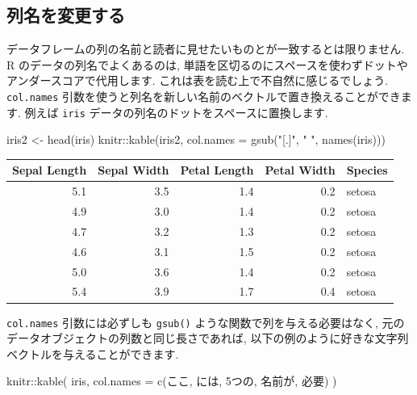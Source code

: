 \documentclass[
  11pt,
  lualatex,ja=standard,jafont=noto]{bxjsreport}
\newenvironment{Shaded}{\begin{snugshade}}{\end{snugshade}}
\newcommand{\AttributeTok}[1]{\textcolor[rgb]{0.77,0.63,0.00}{#1}}
\newcommand{\FunctionTok}[1]{\textcolor[rgb]{0.00,0.00,0.00}{#1}}
\newcommand{\NormalTok}[1]{#1}
\newcommand{\OtherTok}[1]{\textcolor[rgb]{0.56,0.35,0.01}{#1}}
\newcommand{\SpecialCharTok}[1]{\textcolor[rgb]{0.00,0.00,0.00}{#1}}
\newcommand{\StringTok}[1]{\textcolor[rgb]{0.31,0.60,0.02}{#1}}
\begin{document}
\hypertarget{change-column-names}{%
\subsection{列名を変更する}\label{change-column-names}}

データフレームの列の名前と読者に見せたいものとが一致するとは限りません. R のデータの列名でよくあるのは, 単語を区切るのにスペースを使わずドットやアンダースコアで代用します. これは表を読む上で不自然に感じるでしょう. \texttt{col.names} 引数を使うと列名を新しい名前のベクトルで置き換えることができます. 例えば \texttt{iris} データの列名のドットをスペースに置換します.

\begin{Shaded}
\begin{Highlighting}[numbers=left,,]
\NormalTok{iris2 }\OtherTok{\textless{}{-}} \FunctionTok{head}\NormalTok{(iris)}
\NormalTok{knitr}\SpecialCharTok{::}\FunctionTok{kable}\NormalTok{(iris2, }\AttributeTok{col.names =} \FunctionTok{gsub}\NormalTok{(}\StringTok{"[.]"}\NormalTok{, }\StringTok{" "}\NormalTok{, }\FunctionTok{names}\NormalTok{(iris)))}
\end{Highlighting}
\end{Shaded}

\begin{tabular}{r|r|r|r|l}
\hline
Sepal Length & Sepal Width & Petal Length & Petal Width & Species\\
\hline
5.1 & 3.5 & 1.4 & 0.2 & setosa\\
\hline
4.9 & 3.0 & 1.4 & 0.2 & setosa\\
\hline
4.7 & 3.2 & 1.3 & 0.2 & setosa\\
\hline
4.6 & 3.1 & 1.5 & 0.2 & setosa\\
\hline
5.0 & 3.6 & 1.4 & 0.2 & setosa\\
\hline
5.4 & 3.9 & 1.7 & 0.4 & setosa\\
\hline
\end{tabular}

\texttt{col.names} 引数には必ずしも \texttt{gsub()} ような関数で列を与える必要はなく, 元のデータオブジェクトの列数と同じ長さであれば, 以下の例のように好きな文字列ベクトルを与えることができます.

\begin{Shaded}
\begin{Highlighting}[numbers=left,,]
\NormalTok{knitr}\SpecialCharTok{::}\FunctionTok{kable}\NormalTok{(}
\NormalTok{  iris,}
  \AttributeTok{col.names =} \FunctionTok{c}\NormalTok{(}\StringTok{\textquotesingle{}ここ\textquotesingle{}}\NormalTok{, }\StringTok{\textquotesingle{}には\textquotesingle{}}\NormalTok{, }\StringTok{\textquotesingle{}5つの\textquotesingle{}}\NormalTok{, }\StringTok{\textquotesingle{}名前が\textquotesingle{}}\NormalTok{, }\StringTok{\textquotesingle{}必要\textquotesingle{}}\NormalTok{)}
\NormalTok{)}
\end{Highlighting}
\end{Shaded}
\end{document}
